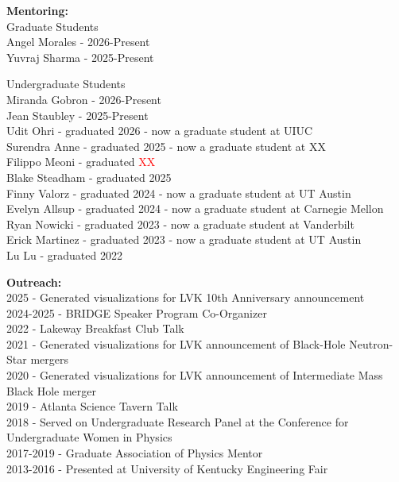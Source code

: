 \documentclass[11pt]{article}
\begin{document}
\begin{flushleft}
  \vspace{8px}
  
  \textbf{Mentoring:}\\
  Graduate Students\\
  \quad Angel Morales - 2026-Present\\
  \quad Yuvraj Sharma - 2025-Present\\
  
  \vspace{4px}
   
   Undergraduate Students \\
   \quad Miranda Gobron - 2026-Present\\
   \quad Jean Staubley - 2025-Present\\
   \quad Udit Ohri - graduated 2026 - now a graduate student at UIUC\\
   \quad Surendra Anne - graduated 2025 - now a graduate student at XX\\
   \quad Filippo Meoni - graduated \textcolor{red}{XX} \\
   \quad Blake Steadham - graduated 2025\\
   \quad Finny Valorz - graduated 2024 - now a graduate student at UT Austin\\   
   \quad Evelyn Allsup - graduated 2024 - now a graduate student at Carnegie Mellon\\
   \quad Ryan Nowicki - graduated 2023 - now a graduate student at Vanderbilt\\
   \quad Erick Martinez - graduated 2023 - now a graduate student at UT Austin\\
   \quad Lu Lu - graduated 2022\\
    
 
  \vspace{8px}   
 
  \textbf{Outreach:}\\
  2025 - Generated visualizations for LVK 10th Anniversary announcement\\
  2024-2025 - BRIDGE Speaker Program Co-Organizer\\ 
  2022 - Lakeway Breakfast Club Talk\\
  2021 - Generated visualizations for LVK announcement of Black-Hole Neutron-Star mergers\\
  2020 - Generated visualizations for LVK announcement of Intermediate Mass Black Hole merger\\
  2019 - Atlanta Science Tavern Talk\\
  2018 - Served on Undergraduate Research Panel at the Conference for Undergraduate Women in Physics\\
  2017-2019 - Graduate Association of Physics Mentor\\
  2013-2016 - Presented at University of Kentucky Engineering Fair\\


\end{flushleft}
\end{document}
